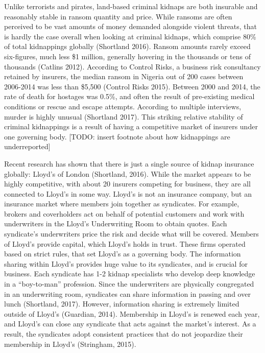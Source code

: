 \documentclass[12pt]{article}
\begin{document}
Unlike terrorists and pirates, land-based criminal kidnaps are both insurable and reasonably stable in ransom quantity and price. While ransoms are often perceived to be vast amounts of money demanded alongside violent threats, that is hardly the case overall when looking at criminal kidnaps, which comprise 80\% of total kidnappings globally (Shortland 2016). Ransom amounts rarely exceed six-figures, much less \$1 million, generally hovering in the thousands or tens of thousands (Catlins 2012). According to Control Risks, a business risk consultancy retained by insurers, the median ransom in Nigeria out of 200 cases between 2006-2014 was less than \$5,500 (Control Risks 2015). Between 2000 and 2014, the rate of death for hostages was 0.5\%, and often the result of pre-existing medical conditions or rescue and escape attempts. According to multiple interviews, murder is highly unusual (Shortland 2017). This striking relative stability of criminal kidnappings is a result of having a competitive market of insurers under one governing body. [TODO: insert footnote about how kidnappings are underreported] 

Recent research has shown that there is just a single source of kidnap insurance globally: Lloyd's of London (Shortland, 2016). While the market appears to be highly competitive, with about 20 insurers competing for business, they are all connected to Lloyd's in some way. Lloyd's is not an insurance company, but an insurance market where members join together as syndicates. For example, brokers and coverholders act on behalf of potential customers and work with underwriters in the Lloyd's Underwriting Room to obtain quotes. Each syndicate's underwriters price the risk and decide what will be covered. Members of Lloyd's provide capital, which Lloyd's holds in trust. These firms operated based on strict rules, that set Lloyd's as a governing body. The information sharing within Lloyd's provides huge value to its syndicates, and is crucial for business. Each syndicate has 1-2 kidnap specialists who develop deep knowledge in a ``boy-to-man'' profession. Since the underwriters are physically congregated in an underwriting room, syndicates can share information in passing and over lunch (Shortland, 2017). However, information sharing is extremely limited outside of Lloyd's (Guardian, 2014). Membership in Lloyd's is renewed each year, and Lloyd's can close any syndicate that acts against the market's interest. As a result, the syndicates adopt consistent practices that do not jeopardize their membership in Lloyd's (Stringham, 2015).
\end{document}
